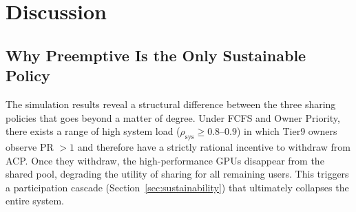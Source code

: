 
\section{Discussion}
\label{sec:discussion}

%

\subsection{Why Preemptive Is the Only Sustainable Policy}
\label{sec:discussion_why}


The simulation results reveal a structural difference between the three
sharing policies that goes beyond a matter of degree.
Under FCFS and Owner Priority, there exists a range of high system load
($\rho_\mathrm{sys} \geq 0.8$--$0.9$) in which Tier9 owners observe PR $> 1$
and therefore have a strictly rational incentive to withdraw from ACP.
Once they withdraw, the high-performance GPUs disappear from the shared pool,
degrading the utility of sharing for all remaining users.
This triggers a participation cascade (Section~\ref{sec:sustainability})
that ultimately collapses the entire system.


